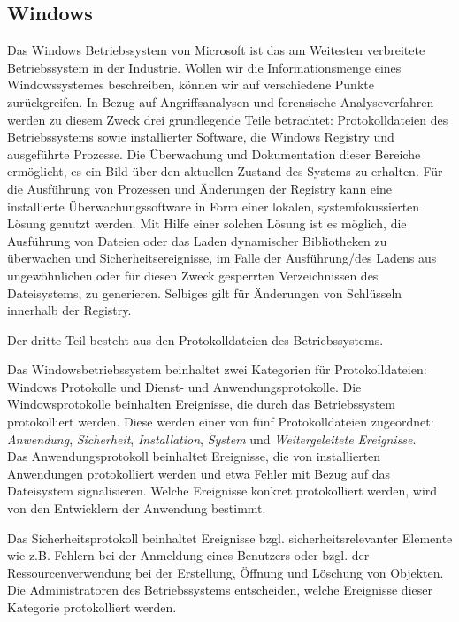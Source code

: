 \subsection{Windows}
Das Windows Betriebssystem von Microsoft ist das am Weitesten verbreitete Betriebssystem in der Industrie. Wollen wir die Informationsmenge eines Windowssystemes beschreiben, können wir auf verschiedene Punkte zurückgreifen. In Bezug auf Angriffsanalysen und forensische Analyseverfahren werden zu diesem Zweck drei grundlegende Teile betrachtet: Protokolldateien des Betriebssystems sowie installierter Software, die Windows Registry und ausgeführte Prozesse. Die Überwachung und Dokumentation dieser Bereiche ermöglicht, es ein Bild über den aktuellen Zustand des Systems zu erhalten. 
Für die Ausführung von Prozessen und Änderungen der Registry kann eine installierte Überwachungssoftware in Form einer lokalen, systemfokussierten Lösung genutzt werden. Mit Hilfe einer solchen Lösung ist es möglich, die Ausführung von Dateien oder das Laden dynamischer Bibliotheken zu überwachen und Sicherheitsereignisse,  im Falle der Ausführung/des Ladens aus ungewöhnlichen oder für diesen Zweck gesperrten Verzeichnissen des Dateisystems, zu generieren. Selbiges gilt für Änderungen von Schlüsseln innerhalb der Registry. 

Der dritte Teil besteht aus den Protokolldateien des Betriebssystems. 

Das Windowsbetriebssystem beinhaltet zwei Kategorien für Protokolldateien: Windows Protokolle und Dienst- und Anwendungsprotokolle. 
Die Windowsprotokolle beinhalten Ereignisse, die durch das Betriebssystem protokolliert werden. Diese werden einer von fünf Protokolldateien zugeordnet: \textit{Anwendung}, \textit{Sicherheit}, \textit{Installation}, \textit{System} und \textit{Weitergeleitete Ereignisse}. \\

Das Anwendungsprotokoll beinhaltet Ereignisse, die von installierten Anwendungen protokolliert werden und etwa Fehler mit Bezug auf das Dateisystem signalisieren. Welche Ereignisse konkret protokolliert werden, wird von den Entwicklern der Anwendung bestimmt. 

Das Sicherheitsprotokoll beinhaltet Ereignisse bzgl. sicherheitsrelevanter Elemente wie z.B. Fehlern bei der Anmeldung eines Benutzers oder bzgl. der Ressourcenverwendung bei der Erstellung, Öffnung und Löschung von Objekten. Die Administratoren des Betriebssystems entscheiden, welche Ereignisse dieser Kategorie protokolliert werden. 

